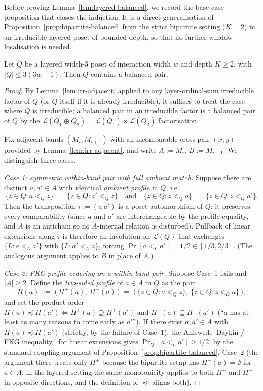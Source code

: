 Before proving Lemma~\ref{lem:layered-balanced}, we record the
base-case proposition that closes the induction. It is a direct
generalisation of Proposition~\ref{prop:bipartite-balanced} from the
strict bipartite setting ($K = 2$) to an irreducible layered poset of
bounded depth, so that no further window-localisation is needed.

\begin{proposition}
\label{prop:in-situ-balanced}
Let $Q$ be a layered width-$3$ poset of interaction width $w$ and
depth $K \ge 2$, with $|Q| \le 3(3w+1)$. Then $Q$ contains a balanced
pair.
\end{proposition}

\begin{proof}
By Lemma~\ref{lem:irr-adjacent} applied to any layer-ordinal-sum
irreducible factor of $Q$ (or $Q$ itself if it is already
irreducible), it suffices to treat the case where $Q$ is irreducible;
a balanced pair in an irreducible factor is a balanced pair of $Q$ by
the $\mathcal L(Q_1 \oplus Q_2) = \mathcal L(Q_1) \times \mathcal
L(Q_2)$ factorisation.

Fix adjacent bands $(M_i, M_{i+1})$ with an incomparable cross-pair
$(x, y)$ provided by Lemma~\ref{lem:irr-adjacent}, and write
$A := M_i$, $B := M_{i+1}$. We distinguish three cases.

\medskip\noindent\emph{Case 1: symmetric within-band pair with full
ambient match.} Suppose there are distinct $a, a' \in A$ with
identical \emph{ambient profile} in $Q$, i.e.
\[
  \{z \in Q : a <_Q z\} \;=\; \{z \in Q : a' <_Q z\}
  \quad\text{and}\quad
  \{z \in Q : z <_Q a\} \;=\; \{z \in Q : z <_Q a'\}.
\]
Then the transposition $\tau := (a\ a')$ is a poset-automorphism of
$Q$: it preserves every comparability (since $a$ and $a'$ are
interchangeable by the profile equality, and $A$ is an antichain so
no $A$-internal relation is disturbed). Pullback of linear extensions
along $\tau$ is therefore an involution on $\mathcal L(Q)$ that
exchanges $\{L : a <_L a'\}$ with $\{L : a' <_L a\}$, forcing
$\Pr[a <_L a'] = 1/2 \in [1/3, 2/3]$. (The analogous argument applies
to $B$ in place of $A$.)

\medskip\noindent\emph{Case 2: FKG profile-ordering on a within-band
pair.} Suppose Case~1 fails and $|A| \ge 2$. Define the
\emph{two-sided profile} of $a \in A$ in $Q$ as the pair
\[
  \Pi(a) \;:=\; \big(\, \Pi^+(a),\ \Pi^-(a)\,\big)
  \;=\;
  \big(\,\{z \in Q : a <_Q z\},\ \{z \in Q : z <_Q a\}\,\big),
\]
and set the product order
$\Pi(a) \preceq \Pi(a') \Longleftrightarrow
\Pi^+(a) \supseteq \Pi^+(a')
\text{ and } \Pi^-(a) \subseteq \Pi^-(a')$
(``$a$ has at least as many reasons to come early as $a'$''). If
there exist $a, a' \in A$ with $\Pi(a) \preceq \Pi(a')$ (strictly, by
the failure of Case~1), the Ahlswede--Daykin / FKG
inequality~\cite{AhlswedeDaykin1978, FKG1971} for linear extensions
gives $\Pr_Q[a <_L a'] \ge 1/2$, by the standard coupling argument of
Proposition~\ref{prop:bipartite-balanced}, Case~2 (the argument there
treats only $\Pi^+$ because the bipartite setup has $\Pi^-(a) =
\emptyset$ for $a \in A$; in the layered setting the same monotonicity
applies to both $\Pi^+$ and $\Pi^-$ in opposite directions, and the
definition of $\preceq$ aligns both).


\end{proof}
